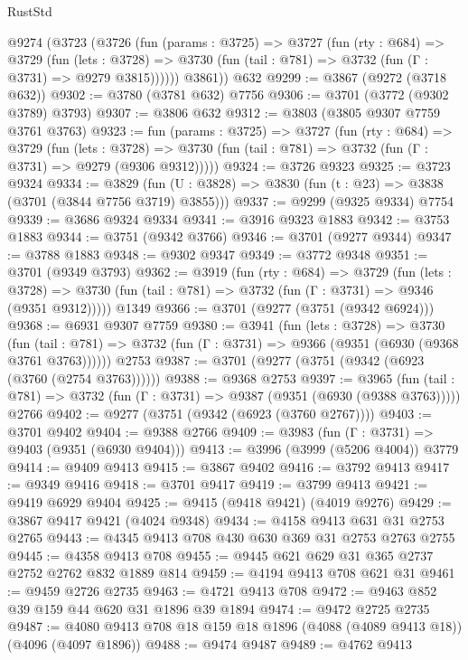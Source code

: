 \begin{lexlean}{RustStd}
\begin{coremodule}
{\begin{coremodule}
{{{{{{{{{{{{{{    @9274
      (@3723
        (@3726
          (fun (params : @3725) =>
          @3727
            (fun (rty : @684) =>
            @3729
              (fun (lets : @3728) =>
              @3730 (fun (tail : @781) => @3732 (fun (Γ : @3731) => @9279 @3815))))))
        @3861))
    @632
@9299 := @3867 (@9272 (@3718 @632))
@9302 := @3780 (@3781 @632) @7756
@9306 := @3701 (@3772 (@9302 @3789) @3793)
@9307 := @3806 @632
@9312 := @3803 (@3805 @9307 @7759 @3761 @3763)
@9323 := fun (params : @3725) =>
  @3727
    (fun (rty : @684) =>
    @3729
      (fun (lets : @3728) =>
      @3730 (fun (tail : @781) => @3732 (fun (Γ : @3731) => @9279 (@9306 @9312)))))
@9324 := @3726 @9323
@9325 := @3723 @9324
@9334 := @3829 (fun (U : @3828) => @3830 (fun (t : @23) => @3838 (@3701 (@3844 @7756 @3719) @3855)))
@9337 := @9299 (@9325 @9334) @7754
@9339 := @3686 @9324 @9334
@9341 := @3916 @9323 @1883
@9342 := @3753 @1883
@9344 := @3751 (@9342 @3766)
@9346 := @3701 (@9277 @9344)
@9347 := @3788 @1883
@9348 := @9302 @9347
@9349 := @3772 @9348
@9351 := @3701 (@9349 @3793)
@9362 := @3919
    (fun (rty : @684) =>
    @3729
      (fun (lets : @3728) =>
      @3730 (fun (tail : @781) => @3732 (fun (Γ : @3731) => @9346 (@9351 @9312)))))
    @1349
@9366 := @3701 (@9277 (@3751 (@9342 @6924)))
@9368 := @6931 @9307 @7759
@9380 := @3941
    (fun (lets : @3728) =>
    @3730
      (fun (tail : @781) => @3732 (fun (Γ : @3731) => @9366 (@9351 (@6930 (@9368 @3761 @3763))))))
    @2753
@9387 := @3701 (@9277 (@3751 (@9342 (@6923 (@3760 (@2754 @3763))))))
@9388 := @9368 @2753
@9397 := @3965
    (fun (tail : @781) => @3732 (fun (Γ : @3731) => @9387 (@9351 (@6930 (@9388 @3763)))))
    @2766
@9402 := @9277 (@3751 (@9342 (@6923 (@3760 @2767))))
@9403 := @3701 @9402
@9404 := @9388 @2766
@9409 := @3983 (fun (Γ : @3731) => @9403 (@9351 (@6930 @9404)))
@9413 := @3996 (@3999 (@5206 @4004)) @3779
@9414 := @9409 @9413
@9415 := @3867 @9402
@9416 := @3792 @9413
@9417 := @9349 @9416
@9418 := @3701 @9417
@9419 := @3799 @9413
@9421 := @9419 @6929 @9404
@9425 := @9415 (@9418 @9421) (@4019 @9276)
@9429 := @3867 @9417 @9421 (@4024 @9348)
@9434 := @4158 @9413 @631 @31 @2753 @2765
@9443 := @4345 @9413 @708 @430 @630 @369 @31 @2753 @2763 @2755
@9445 := @4358 @9413 @708
@9455 := @9445 @621 @629 @31 @365 @2737 @2752 @2762 @832 @1889 @814
@9459 := @4194 @9413 @708 @621 @31
@9461 := @9459 @2726 @2735
@9463 := @4721 @9413 @708
@9472 := @9463 @852 @39 @159 @44 @620 @31 @1896 @39 @1894
@9474 := @9472 @2725 @2735
@9487 := @4080 @9413 @708 @18 @159 @18 @1896 (@4088 (@4089 @9413 @18)) (@4096 (@4097 @1896))
@9488 := @9474 @9487
@9489 := @4762 @9413
}}}}}}}}}}}}}}
\end{coremodule}}
\end{coremodule}
\end{lexlean}

